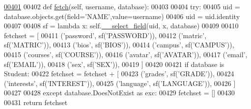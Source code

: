 \begin{DoxyCode}
\hypertarget{classProfile_1_1ProfileUnit_1_1PersProfile_l00401}{}\hyperlink{classProfile_1_1ProfileUnit_1_1PersProfile_aca301abc09bc12a7cf0a61437f941a8a}{00401} 
00402     \textcolor{keyword}{def }\hyperlink{classProfile_1_1ProfileUnit_1_1PersProfile_aca301abc09bc12a7cf0a61437f941a8a}{fetch}(self, username, database):
00403 
00404         \textcolor{keywordflow}{try}:
00405             uid = database.objects.get(field=\textcolor{stringliteral}{'NAME'},value=username)
00406             uid = uid.identity
00407 
00408             sf = \textcolor{keyword}{lambda} x: self.\hyperlink{classProfile_1_1ProfileUnit_1_1PersProfile_a48bc2c04d89772752559fc19dc79f321}{\_\_select\_field}(uid, x, database)
00409 
00410             fetchset = [
00411                     (\textcolor{stringliteral}{'password'},    sf(\textcolor{stringliteral}{'PASSWORD'})),
00412                     (\textcolor{stringliteral}{'matric'},      sf(\textcolor{stringliteral}{'MATRIC'})),
00413                     (\textcolor{stringliteral}{'bios'},        sf(\textcolor{stringliteral}{'BIOS'})),
00414                     (\textcolor{stringliteral}{'campus'},      sf(\textcolor{stringliteral}{'CAMPUS'})),
00415                     (\textcolor{stringliteral}{'courses'},     sf(\textcolor{stringliteral}{'COURSE'})),
00416                     (\textcolor{stringliteral}{'avatar'},      sf(\textcolor{stringliteral}{'AVATAR'})),
00417                     (\textcolor{stringliteral}{'email'},       sf(\textcolor{stringliteral}{'EMAIL'})),
00418                     (\textcolor{stringliteral}{'sex'},         sf(\textcolor{stringliteral}{'SEX'})),
00419             ]
00420 
00421             \textcolor{keywordflow}{if} database \textcolor{keywordflow}{is} Student:
00422                 fetchset = fetchset + [     
00423                     (\textcolor{stringliteral}{'grades'},      sf(\textcolor{stringliteral}{'GRADE'})),
00424                     (\textcolor{stringliteral}{'interests'},   sf(\textcolor{stringliteral}{'INTEREST'})),
00425                     (\textcolor{stringliteral}{'language'},    sf(\textcolor{stringliteral}{'LANGUAGE'})),
00426                 ]
00427 
00428         \textcolor{keywordflow}{except} database.DoesNotExist \textcolor{keyword}{as} exc:
00429             fetchset = []
00430 
00431         \textcolor{keywordflow}{return} fetchset

\end{DoxyCode}
